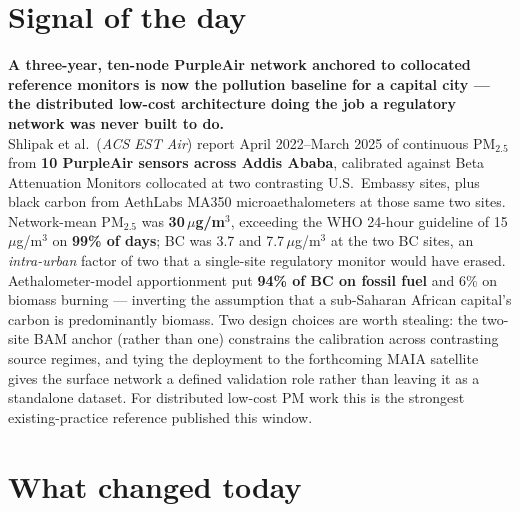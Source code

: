 \documentclass[10pt]{article}
\begin{document}
\vspace{6mm}

\section*{\sffamily\bfseries\color{Deep}Signal of the day}
\vspace{-1.5mm}{\color{Amber}\rule{\linewidth}{1.1pt}}\vspace{2.5mm}

\begin{keybox}
{\sffamily\bfseries\small\color{Deep}A three-year, ten-node PurpleAir network anchored to
collocated reference monitors is now the pollution baseline for a capital city ---
the distributed low-cost architecture doing the job a regulatory network was never
built to do.}\\[1.4mm]
\footnotesize
Shlipak et al.\ (\textit{ACS EST Air}) report April 2022--March 2025 of continuous PM$_{2.5}$
from \textbf{10 PurpleAir sensors across Addis Ababa}, calibrated against Beta Attenuation
Monitors collocated at two contrasting U.S.\ Embassy sites, plus black carbon from
AethLabs MA350 microaethalometers at those same two sites. Network-mean PM$_{2.5}$ was
\textbf{30\,$\mu$g/m$^3$}, exceeding the WHO 24-hour guideline of 15\,$\mu$g/m$^3$ on
\textbf{99\% of days}; BC was 3.7 and 7.7\,$\mu$g/m$^3$ at the two BC sites, an
\emph{intra-urban} factor of two that a single-site regulatory monitor would have erased.
Aethalometer-model apportionment put \textbf{94\% of BC on fossil fuel} and 6\% on biomass
burning --- inverting the assumption that a sub-Saharan African capital's carbon is
predominantly biomass. Two design choices are worth stealing: the two-site BAM anchor
(rather than one) constrains the calibration across contrasting source regimes, and
tying the deployment to the forthcoming MAIA satellite gives the surface network a
defined validation role rather than leaving it as a standalone dataset. For distributed
low-cost PM work this is the strongest existing-practice reference published this window.
\end{keybox}

\vspace{3mm}

\section*{\sffamily\bfseries\color{Deep}What changed today}
\vspace{-1.5mm}{\color{Amber}\rule{\linewidth}{1.1pt}}\vspace{2.5mm}
\end{document}
